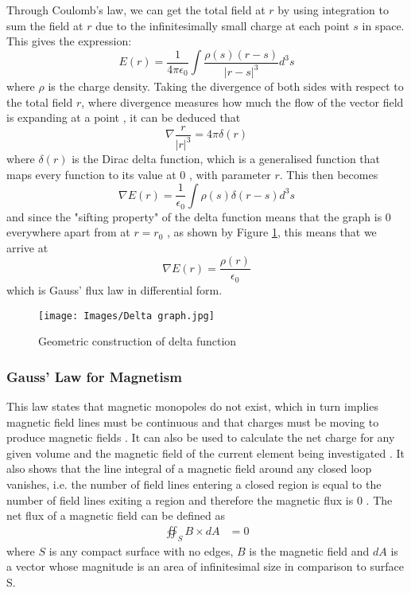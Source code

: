 \documentclass{article}
\begin{document}
Through Coulomb's law, we can get the total field at \(r\) by using integration to sum the field at \(r\) due to the infinitesimally small charge at each point \(s\) in space. This gives the expression: \[E(r) = \frac{1}{4\pi \epsilon_0}\int\frac{\rho(s)(r-s)}{|r-s|^3} d^3 s\] where \(\rho\) is the charge density. Taking the divergence of both sides with respect to the total field \(r\), where divergence measures how much the flow of the vector field is expanding at a point \cite{delta}, it can be deduced that \[\nabla \frac{r}{|r|^3}=4\pi\delta(r)\] where \(\delta(r)\) is the Dirac delta function, which is a generalised function that maps every function to its value at 0 \cite{delta}, with parameter \(r\). This then becomes \[\nabla E(r) =\frac{1}{\epsilon_0}\int \rho (s)\delta(r-s)d^3s\] and since the "sifting property" of the delta function means that the graph is 0 everywhere apart from at \(r = r_0\) \cite{delta}, as shown by Figure \ref{delta}, this means that we arrive at \[\nabla E(r) = \frac{\rho (r)}{\epsilon_0}\] which is Gauss' flux law in differential form.
\begin{figure}[H]
  \centering
  \texttt{[image: Images/Delta graph.jpg]}
  \caption{Geometric construction of delta function}
  \label{delta}
\end{figure} 

\subsubsection{Gauss' Law for Magnetism}
This law states that magnetic monopoles do not exist, which in turn implies magnetic field lines must be continuous and that charges must be moving to produce magnetic fields \cite{electrodynamics}. It can also be used to calculate the net charge for any given volume and the magnetic field of the current element being investigated \cite{electrodynamics}. It also shows that the line integral of a magnetic field around any closed loop vanishes, i.e. the number of field lines entering a closed region is equal to the number of field lines exiting a region and therefore the magnetic flux is 0 \cite{electrodynamics}. The net flux of a magnetic field can be defined as \begin{align*}
  \oiint_{S}B\times dA &= 0
\end{align*}
where \(S\) is any compact surface with no edges, \(B\) is the magnetic field and \(dA\) is a vector whose magnitude is an area of infinitesimal size in comparison to surface S. 
\end{document}
